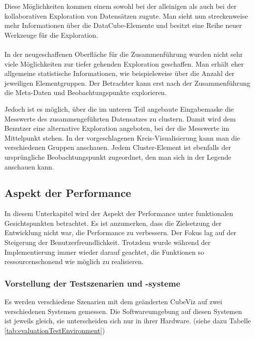 \documentclass[11pt]{article}
\begin{document}
Diese Möglichkeiten kommen einem sowohl bei der alleinigen als auch bei der kollaborativen Exploration von Datensätzen zugute. Man sieht nun streckenweise mehr Informationen über die DataCube-Elemente und besitzt eine Reihe neuer Werkzeuge für die Exploration.


\paragraph{} In der neugeschaffenen Oberfläche für die Zusammenführung wurden nicht sehr viele Möglichkeiten zur tiefer gehenden Exploration geschaffen. Man erhält eher allgemeine statistische Informationen, wie beispielsweise über die Anzahl der jeweiligen Elementgruppen. Der Betrachter kann erst nach der Zusammenführung die Meta-Daten und Beobachtungspunkte explorieren. 

Jedoch ist es möglich, über die im unteren Teil angebaute Eingabemaske die Messwerte des zusammengeführten Datensatzes zu clustern. Damit wird dem Benutzer eine alternative Exploration angeboten, bei der die Messwerte im Mittelpunkt stehen. In der vorgeschlagenen Kreis-Visualisierung kann man die verschiedenen Gruppen anschauen. Jedem Cluster-Element ist ebenfalls der ursprüngliche Beobachtungspunkt zugeordnet, den man sich in der Legende anschauen kann.

%
%
\subsection{Aspekt der Performance}
\label{sec:chapterEvaluationAspectPerformance}

In diesem Unterkapitel wird der Aspekt der Performance unter funktionalen Gesichtspunkten betrachtet. Es ist anzumerken, dass die Zielsetzung der Entwicklung nicht war, die Performance zu verbessern. Der Fokus lag auf der Steigerung der Benutzerfreundlichkeit. Trotzdem wurde während der Implementierung immer wieder darauf geachtet, die Funktionen so ressourcenschonend wie möglich zu realisieren.

%
%
%
\subsubsection{Vorstellung der Testszenarien und -systeme}

Es werden verschiedene Szenarien mit dem geänderten CubeViz auf zwei verschiedenen Systemen gemessen. Die Softwareumgebung auf diesen Systemen ist jeweils gleich, sie unterscheiden sich nur in ihrer Hardware. (siehe dazu Tabelle \ref{tab:evaluationTestEnvironment}) \\
\end{document}
